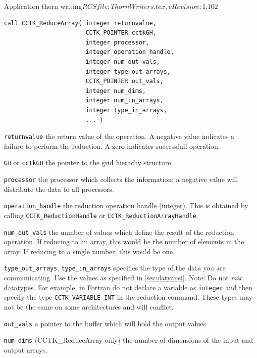 \begin{cactuspart}{2}{Application thorn writing}{$RCSfile: ThornWriters.tex,v $}{$Revision: 1.102 $}
\begin{verbatim}
call CCTK_ReduceArray( integer returnvalue,
                       CCTK_POINTER cctkGH,
                       integer processor,
                       integer operation_handle,
                       integer num_out_vals,
                       integer type_out_arrays,
                       CCTK_POINTER out_vals,
                       integer num_dims,
                       integer num_in_arrays,
                       integer type_in_arrays,
                       ... )
\end{verbatim}

\begin{Lentry}
\item[{\tt returnvalue}] the return value of the operation.  A
negative value indicates a failure to perform the reduction.  A zero
indicates successfull operation.

\item[{\tt GH} or {\tt cctkGH}] the pointer to the grid hierachy
structure.

\item[{\tt processor}] the processor which collects the
information; a negative value will distribute the data to all
processors.

\item[{\tt operation\_handle}] the reduction operation handle
(integer).  This is obtained by calling {\tt CCTK\_ReductionHandle} or
{\tt CCTK\_ReductionArrayHandle}.

\item[{\tt num\_out\_vals}] the number of values which define the
result of the reduction operation.  If reducing to an array, this
would be the number of elements in the array.  If reducing to a single
number, this would be one.

\item[{\tt type\_out\_arrays}, {\tt type\_in\_arrays}]
specifies the type of the data
you are communicating.  Use the values as specified in
\ref{sec:datyansi}. Note: Do not {\em mix} datatypes.  For example, in
Fortran do not declare a variable as {\tt integer} and then specify
the type {\tt CCTK\_VARIABLE\_INT} in the reduction command. These
types may not be the same on some architectures and will conflict.

\item[{\tt out\_vals}] a pointer to the buffer which will hold the
output values.

\item[{\tt num\_dims}] (CCTK\_ReduceArray only) the number of dimensions of the input and output arrays.


\end{Lentry}
\end{cactuspart}
